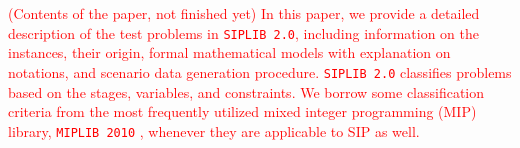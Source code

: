 \textcolor{red}{(Contents of the paper, not finished yet) In this paper, we provide a detailed description of the test problems in \texttt{SIPLIB 2.0}, including information on the instances, their origin, formal mathematical models with explanation on notations, and scenario data generation procedure. \texttt{SIPLIB 2.0} classifies problems based on the stages, variables, and constraints. We borrow some classification criteria from the most frequently utilized mixed integer programming (MIP) library, \texttt{MIPLIB 2010} \cite{MIPLIB}, whenever they are applicable to SIP as well.}
